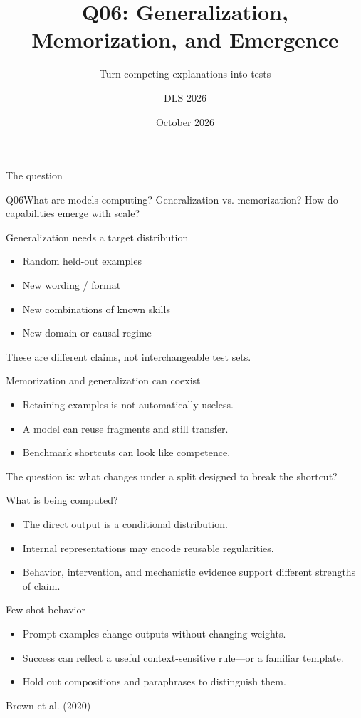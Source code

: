 \documentclass[aspectratio=169,10pt]{beamer}\usetheme{metropolis}
\title{Q06: Generalization, Memorization, and Emergence}\subtitle{Turn competing explanations into tests}\author{DLS 2026}\date{October 2026}
\begin{document}
\maketitle
\begin{frame}{The question}\begin{block}{Q06}What are models computing? Generalization vs. memorization? How do capabilities emerge with scale?\end{block}\end{frame}
\begin{frame}{Generalization needs a target distribution}\begin{itemize}\item Random held-out examples\item New wording / format\item New combinations of known skills\item New domain or causal regime\end{itemize}\alert{These are different claims, not interchangeable test sets.}\end{frame}
\begin{frame}{Memorization and generalization can coexist}\begin{itemize}\item Retaining examples is not automatically useless.\item A model can reuse fragments and still transfer.\item Benchmark shortcuts can look like competence.\end{itemize}\vfill The question is: what changes under a split designed to break the shortcut?\end{frame}
\begin{frame}{What is being computed?}\begin{itemize}\item The direct output is a conditional distribution.\item Internal representations may encode reusable regularities.\item Behavior, intervention, and mechanistic evidence support different strengths of claim.\end{itemize}\end{frame}
\begin{frame}{Few-shot behavior}\begin{itemize}\item Prompt examples change outputs without changing weights.\item Success can reflect a useful context-sensitive rule---or a familiar template.\item Hold out compositions and paraphrases to distinguish them.\end{itemize}\vfill\small Brown et al. (2020)\end{frame}
\end{document}
